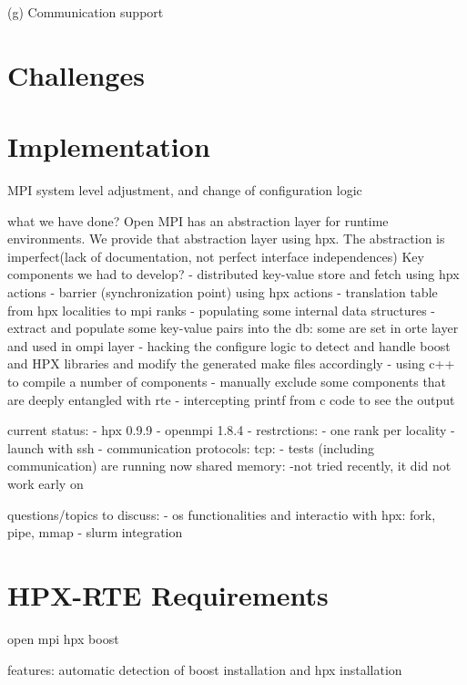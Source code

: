   (g) Communication support

\section{Challenges}
\label{sec:challenges}




\section{Implementation}
\label{sec:implementation}
MPI system level adjustment, and change of configuration logic

what we have done?
Open MPI has an abstraction layer for runtime environments.
We provide that abstraction layer using hpx.
The abstraction is imperfect(lack of documentation,
not perfect interface independences)
Key components we had to develop?
- distributed key-value store and fetch using hpx actions
- barrier (synchronization point) using hpx actions
- translation table from hpx localities to mpi ranks
- populating some internal data structures
- extract and populate some key-value pairs into the db:
some are set in orte layer and used in ompi layer
- hacking the configure logic to detect and handle boost and HPX libraries
and modify the generated make files accordingly
- using c++ to compile a number of components
- manually exclude some components that are deeply entangled with rte
- intercepting printf from c code to see the output


current status:
- hpx 0.9.9
- openmpi 1.8.4
- restrctions: - one rank per locality
- launch with ssh
- communication protocols:
tcp: - tests (including communication) are running now
shared memory: -not tried recently, it did not work early on

questions/topics to discuss:
- os functionalities and interactio with hpx: fork, pipe, mmap
- slurm integration

\fi

\section{HPX-RTE Requirements}
open mpi
hpx
boost

features:
automatic detection of boost installation and hpx installation
